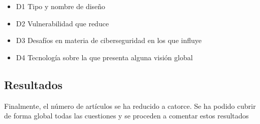 \documentclass[12pt,a4paper,onecolumn,oneside]{report}
\begin{document}
\begin{itemize}
\item D1 Tipo y nombre de diseño
\item D2 Vulnerabilidad que reduce
\item D3 Desafíos en materia de ciberseguridad en los que influye
\item D4 Tecnología sobre la que presenta alguna visión global
\end{itemize}


\subsection{Resultados}

Finalmente, el número de artículos se ha reducido a catorce. Se ha podido cubrir de forma global todas las cuestiones y se proceden a comentar estos resultados
\end{document}
